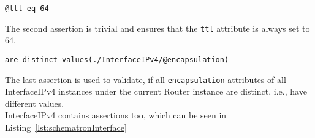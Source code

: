 \begin{verbatim}
@ttl eq 64
\end{verbatim}
The second assertion is trivial and ensures that the \verb|ttl| attribute is always set to 64. \\

\begin{verbatim}
are-distinct-values(./InterfaceIPv4/@encapsulation)
\end{verbatim}
The last assertion is used to validate, if all \verb|encapsulation| attributes of all \textsf{InterfaceIPv4} instances under the current \textsf{Router} instance are distinct, i.e., have different values.\\

\textsf{InterfaceIPv4} contains assertions too, which can be seen in Listing~\ref{lst:schematronInterface}



